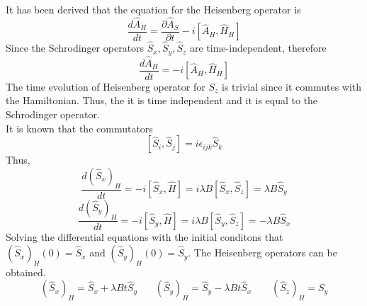 \begin{sol}
It has been derived that the equation for the Heisenberg operator is
$$\frac{d\hat A_H}{dt}=\frac{\partial \hat A_S}{\partial t}-i[\hat A_H,\hat H_H]$$
Since the Schrodinger operators $\hat S_x,\hat S_y,\hat S_z$ are time-independent, therefore
$$\frac{d\hat A_H}{dt}=-i[\hat A_H,\hat H_H]$$
The time evolution of Heisenberg operator for $S_z$ is trivial since it commutes with the Hamiltonian. Thus, the it is time independent and it is equal to the Schrodinger operator.\\
It is known that the commutators
$$[\hat S_i,\hat S_j]=i\epsilon_{ijk}\hat S_k$$ 
Thus,
$$\frac{d(\hat S_x)_H}{dt}=-i[\hat S_x,\hat H]=i\lambda B[\hat S_x,\hat S_z]=\lambda B\hat S_y$$
$$\frac{d(\hat S_y)_H}{dt}=-i[\hat S_y,\hat H]=i\lambda B[\hat S_y,\hat S_z]=-\lambda B\hat S_x$$
Solving the differential equations with the initial conditons that $(\hat S_x)_H(0)=\hat S_x$ and $(\hat S_y)_H(0)=\hat S_y$. The Heisenberg operators can be obtained.
$$(\hat S_x)_H=\hat S_x+\lambda Bt\hat S_y\:\:\:\:\:\:\:\:(\hat S_y)_H=\hat S_y-\lambda Bt\hat S_x\:\:\:\:\:\:\:\:\:(\hat S_z)_H=S_y$$ 

\end{sol}